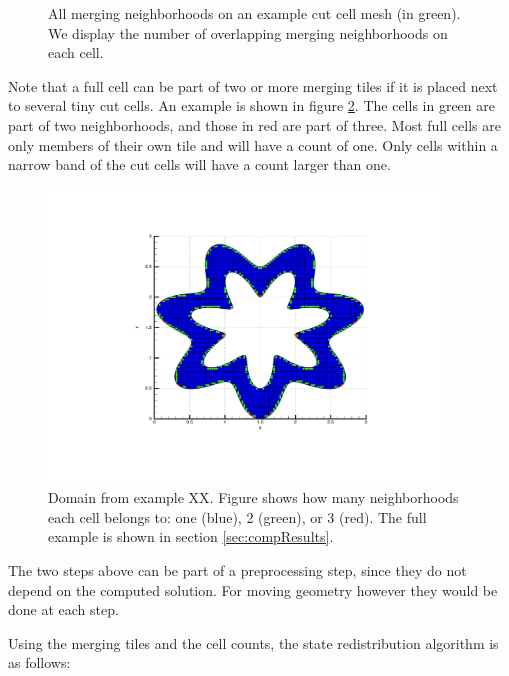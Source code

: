 \begin{itemize}
\begin{figure}
	\caption{All merging neighborhoods on an example cut cell mesh (in green).  We display the number of overlapping merging neighborhoods on each cell.} \label{fig:overlappingneighs}
\end{figure}
Note that a full cell
can be part of two or more merging tiles if it is placed next to 
several tiny cut cells. An example is shown in
figure \ref{fig:2nborTile}. The cells in green are part of two
neighborhoods, and those in red are part of three.   
 Most full
cells are only members of their own tile and will have a count of one.
Only cells within a narrow band of the cut cells will have a count
larger than one.



\end{itemize}

\begin{figure}[h!]
\begin{center}
\includegraphics[width=4.1in]{figs/wavyfig.pdf}
\caption{\sf Domain from example XX.  Figure shows how many
neighborhoods each cell belongs to: 
one (blue), 2 (green), or 3 (red).
The full example is shown in section \ref{sec:compResults}.}
\label{fig:2nborTile}
\end{center}
\end{figure}

The two steps above can be part of a preprocessing step, since they do not
depend on the computed solution. For moving geometry however they would
be done at each step.

Using the merging tiles and the cell counts, the state redistribution
algorithm is as follows:


